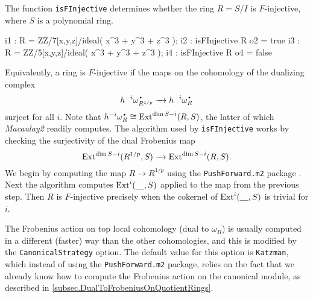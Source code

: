 \documentclass{amsart}
\begin{document}
The function \texttt{isFInjective} determines whether the ring $R = S/I$ is
$F$-injective, where $S$ is a polynomial ring.

\medskip
{\small
\begin{MyVerbatim}
i1 : R = ZZ/7[x,y,z]/ideal( x^3 + y^3 + z^3 );
i2 : isFInjective R
o2 = true
i3 : R = ZZ/5[x,y,z]/ideal( x^3 + y^3 + z^3 );
i4 : isFInjective R
o4 = false
\end{MyVerbatim}
}\medskip

Equivalently, a ring is $F$-injective if the maps on the cohomology of the dualizing complex
\[
h^{-i} \omega_{R^{1/p}}^{\mydot} \to h^{-i} \omega_R^{\mydot}
\]
surject for all $i$.
Note that $h^{-i} \omega_R^{\mydot} \cong \Ext^{\dim S - i}(R, S)$, the latter of which \emph{Macaulay2} readily computes.
The algorithm used by \texttt{isFInjective} works by checking the surjectivity of the dual Frobenius map
\[
\operatorname{Ext}^{\dim S - i}(R^{1/p}, S) \xrightarrow{\ \ } \operatorname{Ext}^{\dim S - i}(R, S).
\]
We begin by computing the map $R
\rightarrow R^{1/p}$ using the \texttt{PushForward.m2} package \cite{PushForward}.
Next the algorithm computes
$\operatorname{Ext}^{i}( \underline{\hskip 10pt}, S)$ applied to the map from the previous step.  Then $R$ is $F$-injective precisely when the
cokernel of $\operatorname{Ext}^{i}( \underline{\hskip 10pt}, S)$ is trivial for $i$.

The Frobenius action on top local cohomology (dual to $\omega_R$) is usually computed in a different (faster) way than the other cohomologies, and this is modified by the \texttt{CanonicalStrategy} option.
The default value for this option is \texttt{Katzman}, which instead of using the \texttt{PushForward.m2} package, relies on the fact that we already know how to compute the Frobenius action on the canonical module, as described in \autoref{subsec.DualToFrobeniusOnQuotientRings}.


\end{document}
